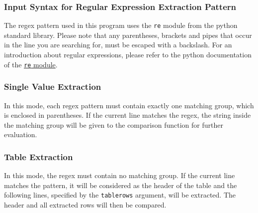 \documentclass[a4paper,12pt]{scrartcl}
\begin{document}
\subsubsection*{Input Syntax for Regular Expression Extraction Pattern}
The regex pattern used in this program uses the \texttt{re} module from the python standard library. Please note that
any parentheses, brackets and pipes that occur in the line you are searching for, must be escaped with a backslash.
For an introduction about regular expressions, please refer to the python documentation of the
\href{https://docs.python.org/3.2/library/re.html}{\texttt{re} module}.

\subsubsection*{Single Value Extraction}
In this mode, each regex pattern must contain exactly one matching group, which is enclosed in parentheses. If the
current line matches the regex, the string inside the matching group will be given to the comparison function for
further evaluation.

\subsubsection*{Table Extraction}
In this mode, the regex must contain no matching group. If the current line matches the pattern, it will be
considered as the header of the table and the following lines, specified by the \texttt{tablerows} argument, will be
extracted. The header and all extracted rows will then be compared.
\end{document}
